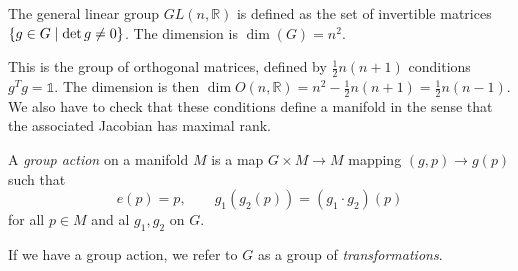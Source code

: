 \begin{example}[$G = GL(n, \mathbb{R}) \in \mathbb{R}^{n^2}$]
  The general linear group $GL(n, \mathbb{R})$ is defined as the set of invertible matrices $\{g \in G \suchthat \det g \neq 0\}$.
  The dimension is $\dim (G) = n^2$.
\end{example}
\begin{example}[$G = O(n, \mathbb{R})$]
  This is the group of orthogonal matrices, defined by $\frac{1}{2} n (n + 1)$ conditions $g^T g = \mathbb{1}$.
  The dimension is then $\dim O(n, \mathbb{R}) = n^2 - \frac{1}{2} n (n+1) = \frac{1}{2}n (n-1)$.
  We also have to check that these conditions define a manifold in the sense that the associated Jacobian has maximal rank.
\end{example}

\begin{definition}
  A \emph{group action} on a manifold $M$ is a map $G \times M \to M$ mapping $(g, p) \to g(p)$ such that
  \begin{equation}
    e(p) = p, \qquad g_1(g_2(p)) = (g_1 \cdot g_2) (p)
  \end{equation}
  for all $p \in M$ and al $g_1, g_2$ on $G$.
\end{definition}

\begin{definition}
  If we have a group action, we refer to $G$ as a group of \emph{transformations}.
\end{definition}

